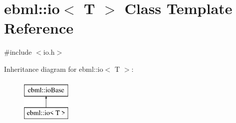 \hypertarget{classebml_1_1io}{}\section{ebml\+:\+:io$<$ T $>$ Class Template Reference}
\label{classebml_1_1io}


{\ttfamily \#include $<$io.\+h$>$}

Inheritance diagram for ebml\+:\+:io$<$ T $>$\+:\begin{figure}[H]
\begin{center}
\leavevmode
\includegraphics[height=2.000000cm]{classebml_1_1io}
\end{center}
\end{figure}
